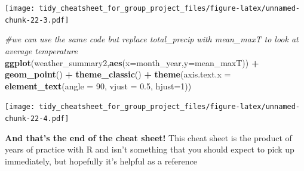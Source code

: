 \documentclass[
]{article}
\newenvironment{Shaded}{\begin{snugshade}}{\end{snugshade}}
\newcommand{\AttributeTok}[1]{\textcolor[rgb]{0.13,0.29,0.53}{#1}}
\newcommand{\CommentTok}[1]{\textcolor[rgb]{0.56,0.35,0.01}{\textit{#1}}}
\newcommand{\DecValTok}[1]{\textcolor[rgb]{0.00,0.00,0.81}{#1}}
\newcommand{\FloatTok}[1]{\textcolor[rgb]{0.00,0.00,0.81}{#1}}
\newcommand{\FunctionTok}[1]{\textcolor[rgb]{0.13,0.29,0.53}{\textbf{#1}}}
\newcommand{\NormalTok}[1]{#1}
\newcommand{\SpecialCharTok}[1]{\textcolor[rgb]{0.81,0.36,0.00}{\textbf{#1}}}
\begin{document}
\texttt{[image: tidy\_cheatsheet\_for\_group\_project\_files/figure-latex/unnamed-chunk-22-3.pdf]}

\begin{Shaded}
\begin{Highlighting}[]
\CommentTok{\#we can use the same code but replace total\_precip with mean\_maxT to look at average temperature}
\FunctionTok{ggplot}\NormalTok{(weather\_summary2,}\FunctionTok{aes}\NormalTok{(}\AttributeTok{x=}\NormalTok{month\_year,}\AttributeTok{y=}\NormalTok{mean\_maxT)) }\SpecialCharTok{+}
  \FunctionTok{geom\_point}\NormalTok{() }\SpecialCharTok{+}
  \FunctionTok{theme\_classic}\NormalTok{() }\SpecialCharTok{+}
  \FunctionTok{theme}\NormalTok{(}\AttributeTok{axis.text.x =} \FunctionTok{element\_text}\NormalTok{(}\AttributeTok{angle =} \DecValTok{90}\NormalTok{, }\AttributeTok{vjust =} \FloatTok{0.5}\NormalTok{, }\AttributeTok{hjust=}\DecValTok{1}\NormalTok{))}
\end{Highlighting}
\end{Shaded}

\texttt{[image: tidy\_cheatsheet\_for\_group\_project\_files/figure-latex/unnamed-chunk-22-4.pdf]}

\textbf{And that's the end of the cheat sheet!} This cheat sheet is the
product of years of practice with R and isn't something that you should
expect to pick up immediately, but hopefully it's helpful as a reference
\end{document}
